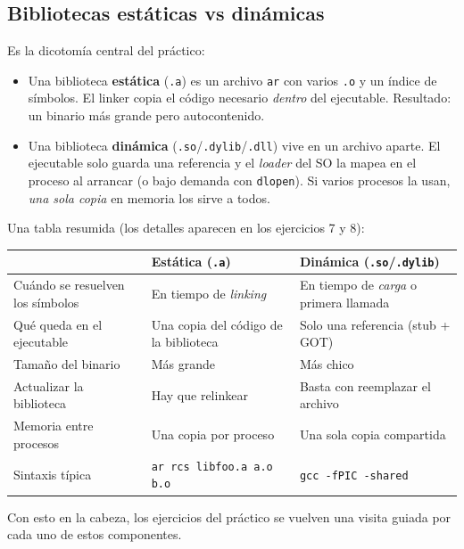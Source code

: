 \documentclass[11pt,a4paper]{article}
\begin{document}
\subsection*{Bibliotecas estáticas vs dinámicas}

Es la dicotomía central del práctico:

\begin{itemize}[leftmargin=*]
    \item Una biblioteca \textbf{estática} (\texttt{.a}) es un archivo
        \texttt{ar} con varios \texttt{.o} y un índice de símbolos.
        El linker copia el código necesario \emph{dentro} del
        ejecutable. Resultado: un binario más grande pero
        autocontenido.
    \item Una biblioteca \textbf{dinámica}
        (\texttt{.so}/\texttt{.dylib}/\texttt{.dll}) vive en un
        archivo aparte. El ejecutable solo guarda una referencia y el
        \emph{loader} del SO la mapea en el proceso al arrancar (o
        bajo demanda con \texttt{dlopen}). Si varios procesos la usan,
        \emph{una sola copia} en memoria los sirve a todos.
\end{itemize}

Una tabla resumida (los detalles aparecen en los ejercicios 7 y 8):

\begin{center}
\small
\begin{tabular}{p{4.0cm} p{4.8cm} p{4.8cm}}
\toprule
 & \textbf{Estática (\texttt{.a})} & \textbf{Dinámica (\texttt{.so}/\texttt{.dylib})} \\
\midrule
Cuándo se resuelven los símbolos & En tiempo de \emph{linking} & En tiempo de \emph{carga} o primera llamada \\
Qué queda en el ejecutable & Una copia del código de la biblioteca & Solo una referencia (stub + GOT) \\
Tamaño del binario & Más grande & Más chico \\
Actualizar la biblioteca & Hay que relinkear & Basta con reemplazar el archivo \\
Memoria entre procesos & Una copia por proceso & Una sola copia compartida \\
Sintaxis típica & \texttt{ar rcs libfoo.a a.o b.o} & \texttt{gcc -fPIC -shared} \\
\bottomrule
\end{tabular}
\end{center}

Con esto en la cabeza, los ejercicios del práctico se vuelven una
visita guiada por cada uno de estos componentes.
\end{document}

